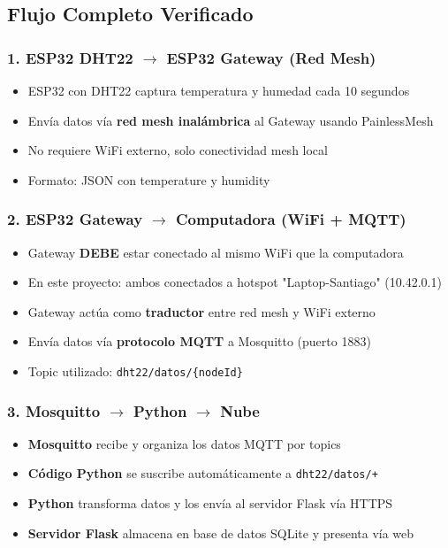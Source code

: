 \documentclass[12pt]{article}
\begin{document}
\subsection{Flujo Completo Verificado}

\subsubsection{1. ESP32 DHT22 $\rightarrow$ ESP32 Gateway (Red Mesh)}
\begin{itemize}
    \item ESP32 con DHT22 captura temperatura y humedad cada 10 segundos
    \item Envía datos vía \textbf{red mesh inalámbrica} al Gateway usando PainlessMesh
    \item No requiere WiFi externo, solo conectividad mesh local
    \item Formato: JSON con temperature y humidity
\end{itemize}

\subsubsection{2. ESP32 Gateway $\rightarrow$ Computadora (WiFi + MQTT)}
\begin{itemize}
    \item Gateway \textbf{DEBE} estar conectado al mismo WiFi que la computadora
    \item En este proyecto: ambos conectados a hotspot "Laptop-Santiago" (10.42.0.1)
    \item Gateway actúa como \textbf{traductor} entre red mesh y WiFi externo
    \item Envía datos vía \textbf{protocolo MQTT} a Mosquitto (puerto 1883)
    \item Topic utilizado: \texttt{dht22/datos/\{nodeId\}}
\end{itemize}

\subsubsection{3. Mosquitto $\rightarrow$ Python $\rightarrow$ Nube}
\begin{itemize}
    \item \textbf{Mosquitto} recibe y organiza los datos MQTT por topics
    \item \textbf{Código Python} se suscribe automáticamente a \texttt{dht22/datos/+}
    \item \textbf{Python} transforma datos y los envía al servidor Flask vía HTTPS
    \item \textbf{Servidor Flask} almacena en base de datos SQLite y presenta vía web
\end{itemize}
\end{document}
